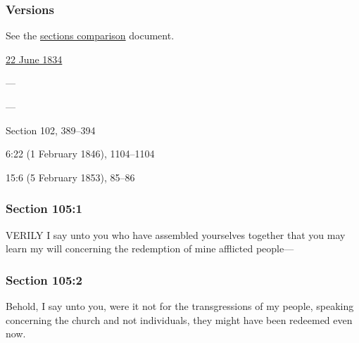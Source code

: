	\subsubsection{Versions}
		\label{DC105-V}
		
		See the \href{https://drive.google.com/file/d/1goAvNz8jS4R8slYfMG_db55Ty2z_vmgK/view?usp=sharing}{sections comparison} document.
	
		\begin{compactdesc}
			\item[JSP] \hyperref[EMS-1834-JS-22-JUN-1834]{22 June 1834}
			\item[BC] ---
			\item[DC 1835] ---
			\item[DC 1844] Section 102, 389--394
			\item[TS] 6:22 (1 February 1846), 1104--1104
			\item[MS] 15:6 (5 February 1853), 85--86
		\end{compactdesc}

	\subsubsection{Section 105:1} %
		\label{DC105-1}

		VERILY I say unto you who have assembled yourselves together that you may learn my will concerning the redemption of mine afflicted people—


	\subsubsection{Section 105:2} %
		\label{DC105-2}

		Behold, I say unto you, were it not for the transgressions of my people, speaking concerning the church and not individuals, they might have been redeemed even now.



